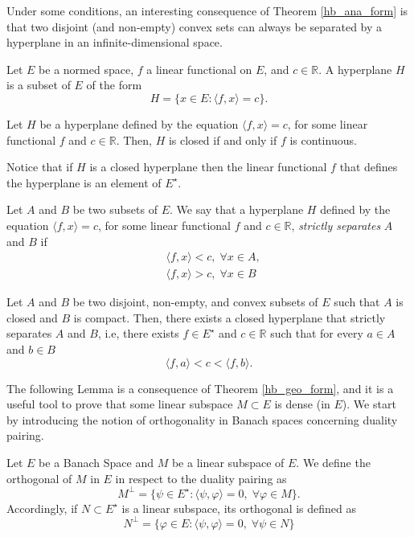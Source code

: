 Under some conditions, an interesting consequence of Theorem \ref{hb_ana_form} is that two disjoint (and non-empty) convex sets can always be separated by a hyperplane in an infinite-dimensional space.
\begin{definition}
    Let \(E\) be a normed space, \(f\) a linear functional on \(E\), and \(c \in \mathbb{R}\). A hyperplane \(H\) is a subset of \(E\) of the form
    \[
        H = \{x \in E: \langle f, x \rangle = c\}.
    \]
\end{definition}
\begin{proposition}
    Let \(H\) be a hyperplane defined by the equation \(\langle f, x \rangle = c\), for some linear functional \(f\) and \(c \in \mathbb{R}\). Then, \(H\) is closed if and only if \(f\) is continuous.
\end{proposition}
Notice that if \(H\) is a closed hyperplane then the linear functional \(f\) that defines the hyperplane is an element of \(E^\star\).
\begin{definition}
    Let \(A\) and \(B\) be two subsets of \(E\). We say that a hyperplane \(H\) defined by the equation \(\langle f, x \rangle = c\), for some linear functional \(f\) and \(c \in \mathbb{R}\), \textit{strictly separates} \(A\) and \(B\) if
    \begin{align*}
        &\langle f, x \rangle < c, \; \forall x \in A,\\
        & \langle f, x \rangle > c, \; \forall x \in B
    \end{align*}
\end{definition}
\begin{theorem}\label{hb_geo_form}
    Let \(A\) and \(B\) be two disjoint, non-empty, and convex subsets of \(E\) such that \(A\) is closed and \(B\) is compact. Then, there exists a closed hyperplane that strictly separates \(A\) and \(B\), i.e, there exists \(f \in E^\star\) and \(c \in \mathbb{R}\) such that for every \(a \in A\) and \(b \in B\)
    \[
        \langle f, a \rangle < c < \langle f, b \rangle.
    \]
\end{theorem}
The following Lemma is a consequence of Theorem \ref{hb_geo_form}, and it is a useful tool to prove that some linear subspace \(M \subset E\) is dense (in \(E\)). We start by introducing the notion of orthogonality in Banach spaces concerning duality pairing.
\begin{definition}\label{banach_ortho_def}
    Let \(E\) be a Banach Space and \(M\) be a linear subspace of \(E\). We define the orthogonal of \(M\) in \(E\) in respect to the duality pairing as
    \[
        M^\perp = \{\psi \in E^\star: \langle \psi, \varphi \rangle = 0, \; \forall \varphi \in M\}.
    \]
    Accordingly, if \(N \subset E^\star\) is a linear subspace, its orthogonal is defined as 
    \[
        N^\perp = \{\varphi \in E: \langle \psi, \varphi \rangle = 0, \; \forall \psi \in N\}
    \]
\end{definition}
